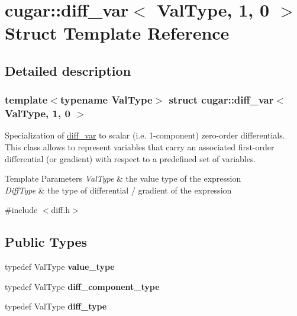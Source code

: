 \hypertarget{structcugar_1_1diff__var_3_01_val_type_00_011_00_010_01_4}{}\section{cugar\+:\+:diff\+\_\+var$<$ Val\+Type, 1, 0 $>$ Struct Template Reference}
\label{structcugar_1_1diff__var_3_01_val_type_00_011_00_010_01_4}


\subsection{Detailed description}
\subsubsection*{template$<$typename Val\+Type$>$\newline
struct cugar\+::diff\+\_\+var$<$ Val\+Type, 1, 0 $>$}

Specialization of \hyperlink{structcugar_1_1diff__var}{diff\+\_\+var} to scalar (i.\+e. 1-\/component) zero-\/order differentials. This class allows to represent variables that carry an associated first-\/order differential (or gradient) with respect to a predefined set of variables.


\begin{DoxyTemplParams}{Template Parameters}
{\em Val\+Type} & the value type of the expression \\
\hline
{\em Diff\+Type} & the type of differential / gradient of the expression \\
\hline
\end{DoxyTemplParams}


{\ttfamily \#include $<$diff.\+h$>$}

\subsection*{Public Types}
\begin{DoxyCompactItemize}
\item 
\mbox{\label{structcugar_1_1diff__var_3_01_val_type_00_011_00_010_01_4_a375def41046c8f36cabf54042fa7a565}} 
typedef Val\+Type {\bfseries value\+\_\+type}
\item 
\mbox{\label{structcugar_1_1diff__var_3_01_val_type_00_011_00_010_01_4_a3d40bab509bdfda7b464adcf39e898aa}} 
typedef Val\+Type {\bfseries diff\+\_\+component\+\_\+type}
\item 
\mbox{\label{structcugar_1_1diff__var_3_01_val_type_00_011_00_010_01_4_aedc476b83df35652b388696eedc37caa}} 
typedef Val\+Type {\bfseries diff\+\_\+type}
\end{DoxyCompactItemize}

